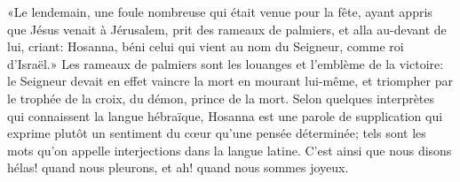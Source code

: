 «Le lendemain, une foule nombreuse qui était venue pour la fête,
	ayant appris que Jésus venait à Jérusalem,
	prit des rameaux de palmiers, et alla au-devant de lui,	criant:
	Hosanna, béni celui qui vient au nom du Seigneur, comme roi d’Israël.»
Les rameaux de palmiers sont les louanges et l’emblème de la victoire:
	le Seigneur devait en effet vaincre la mort en mourant lui-même,
	et triompher par le trophée de la croix, du démon, prince de la mort.
Selon quelques interprètes qui connaissent la langue hébraïque,
	Hosanna est une parole de supplication
	qui exprime plutôt un sentiment du cœur qu’une pensée déterminée;
	tels sont les mots qu’on appelle interjections dans la langue latine.
C’est ainsi que nous disons hélas! quand nous pleurons,
	et ah! quand nous sommes joyeux.

